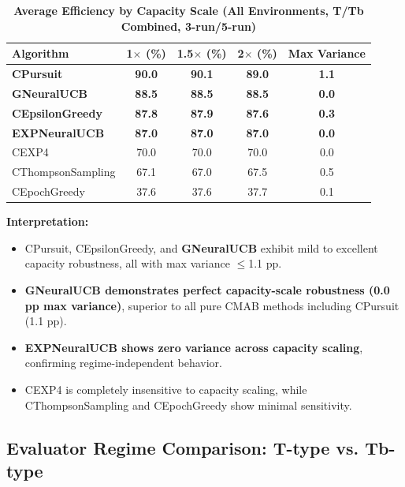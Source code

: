 \documentclass[12pt,a4paper]{article}
\newcommand{\performance}[1]{\textcolor{performancecolor}{\textbf{#1}}}
\newcommand{\legacy}[1]{\textcolor{legacycolor}{\textbf{#1}}}
\newcommand{\neural}[1]{\textcolor{neuralcolor}{\textbf{#1}}}
\begin{document}
\begin{table}[H]
\centering
\caption{\performance{Average Efficiency by Capacity Scale (All Environments, T/Tb Combined, 3-run/5-run)}}
\begin{tabular}{|l|c|c|c|c|}
\hline
\textbf{Algorithm} & \textbf{1$\times$ (\%)} & \textbf{1.5$\times$ (\%)} & \textbf{2$\times$ (\%)} & \textbf{Max Variance} \\
\hline
\hline
\performance{CPursuit}        & \performance{90.0} & \performance{90.1} & \performance{89.0} & \performance{1.1} \\
\neural{GNeuralUCB}          & \neural{88.5} & \neural{88.5} & \neural{88.5} & \neural{0.0} \\
\performance{CEpsilonGreedy} & \performance{87.8} & \performance{87.9} & \performance{87.6} & \performance{0.3} \\
\legacy{EXPNeuralUCB}        & \legacy{87.0}     & \legacy{87.0}     & \legacy{87.0} & \legacy{0.0} \\
CEXP4                        & 70.0              & 70.0              & 70.0 & 0.0 \\
CThompsonSampling            & 67.1              & 67.0              & 67.5 & 0.5 \\
CEpochGreedy                 & 37.6              & 37.6              & 37.7 & 0.1 \\
\hline
\end{tabular}
\end{table}

\textbf{Interpretation:}
\begin{itemize}
\item CPursuit, CEpsilonGreedy, and \neural{GNeuralUCB} exhibit mild to excellent capacity robustness, all with max variance $\leq$1.1 pp.
\item \neural{GNeuralUCB demonstrates perfect capacity-scale robustness (0.0 pp max variance)}, superior to all pure CMAB methods including CPursuit (1.1 pp).
\item \legacy{EXPNeuralUCB shows zero variance across capacity scaling}, confirming regime-independent behavior.
\item CEXP4 is completely insensitive to capacity scaling, while CThompsonSampling and CEpochGreedy show minimal sensitivity.
\end{itemize}

\subsection{Evaluator Regime Comparison: T-type vs. Tb-type}
\end{document}
